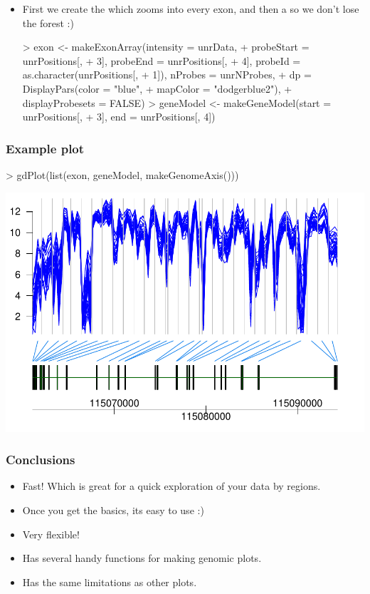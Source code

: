 \begin{frame}
\begin{itemize}
\begin{Schunk}
\begin{Soutput}
\end{Soutput}
\end{Schunk}
  \item First we create the  which zooms into every exon, and then a  so we don't lose the forest :)
\begin{Schunk}
\begin{Sinput}
> exon <- makeExonArray(intensity = unrData, 
+     probeStart = unrPositions[, 
+         3], probeEnd = unrPositions[, 
+         4], probeId = as.character(unrPositions[, 
+         1]), nProbes = unrNProbes, 
+     dp = DisplayPars(color = "blue", 
+         mapColor = "dodgerblue2"), 
+     displayProbesets = FALSE)
> geneModel <- makeGeneModel(start = unrPositions[, 
+     3], end = unrPositions[, 4])
\end{Sinput}
\end{Schunk}
  \end{itemize}
\end{frame}

\begin{frame}
  \frametitle{Example plot}
\begin{Schunk}
\begin{Sinput}
> gdPlot(list(exon, geneModel, makeGenomeAxis()))
\end{Sinput}
\end{Schunk}
\includegraphics{plots/fig-045}
\end{frame}

\begin{frame}[allowframebreaks]
  \frametitle{Conclusions}
  \begin{itemize}
  \item Fast! Which is great for a quick exploration of your data by regions.
  \item Once you get the basics, its easy to use :)
  \item Very flexible!
  \item Has several handy functions for making genomic plots.
  \item Has the same limitations as other  plots.
  \end{itemize}
\end{frame}

